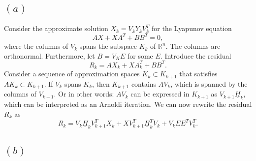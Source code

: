 
\subsection*{$(a)$}
Consider the approximate solution $X_{k} = V_{k}Y_{k}V_{k}^{T}$ for the Lyapunov equation
\begin{equation}
  AX+XA^{T} + BB^{T} = 0,
\end{equation}
where the columns of $V_{k}$ spans the subspace $K_{k}$ of $\mathbb{R}^{n}$. The columns are orthonormal. Furthermore, let $B = V_{K}E$ for some $E$.
Introduce the residual
\begin{equation}
  \label{eq:res}
  R_{k} = AX_{k}+XA_{k}^{T} + BB^{T}.
\end{equation}
Consider a sequence of approximation spaces $K_{k}\subset K_{k+1}$ that satisfies $AK_{k}\subset K_{k+1}$. If $V_{k}$ spans $K_{k}$, then $K_{k+1}$ contains $AV_{k}$, which is spanned by the columns of $V_{k+1}$. Or in other words: $AV_{k}$ can be expressed in $K_{k+1}$ as $V_{k+1}\underline{H}_{k}$, which can be interpreted as an Arnoldi iteration.
We can now rewrite the residual $R_{k}$ as
\begin{equation}
  R_{k} = V_{k}\underline{H}_{k}V_{k+1}^{T} X_{k}+XV_{k+1}^{T}\underline{H}_{k}^{T}V_{k} + V_{k}EE^{T}V_{k}^{T}.
\end{equation}


\subsection*{$(b)$}

